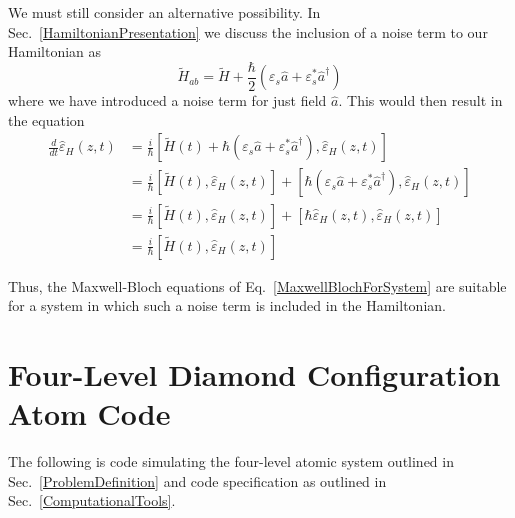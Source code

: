 \documentclass[aps,pra,showpacs,amsmath,amssymb,nofootinbib,longbibliography,superscriptaddress
]{revtex4-1}
\theoremstyle{definition}
\theoremstyle{remark}
\newcommand{\0}{\hat{0}}
\begin{document}
We must still consider an alternative possibility. In Sec.~\ref{HamiltonianPresentation} we discuss the inclusion of a noise term to our Hamiltonian as
\begin{equation}
    \tilde{H}_{ab} = \tilde{H} + 
    \frac{\hbar}{2} \left(\varepsilon_s \hat{a} + \varepsilon_s^* \hat{a}^{\dagger}\right)
\end{equation}
where we have introduced a noise term for just field $\hat{a}$. This would then result in the equation
\begin{align}
    \frac{d}{dt}\hat{\varepsilon}_H(z, t)
    &=
    \frac{i}{\hbar} \left[ \tilde{H}(t) + \hbar \left(\varepsilon_s \hat{a} + \varepsilon_s^* \hat{a}^{\dagger}\right), \hat{\varepsilon}_H(z, t) \right] \nonumber \\
    &=
    \frac{i}{\hbar} \left[ \tilde{H}(t), \hat{\varepsilon}_H(z, t)\right] + \left[\hbar \left(\varepsilon_s \hat{a} + \varepsilon_s^* \hat{a}^{\dagger}\right), \hat{\varepsilon}_H(z, t) \right] \nonumber \\
    &=
    \frac{i}{\hbar} \left[ \tilde{H}(t), \hat{\varepsilon}_H(z, t)\right] + \left[\hbar \hat{\varepsilon}_H(z, t), \hat{\varepsilon}_H(z, t) \right] \nonumber \\
    &=
    \frac{i}{\hbar} \left[ \tilde{H}(t), \hat{\varepsilon}_H(z, t)\right]
\end{align}

Thus, the Maxwell-Bloch equations of Eq.~\eqref{MaxwellBlochForSystem} are suitable for a system in which such a noise term is included in the Hamiltonian.

\pagebreak
\section{Four-Level Diamond Configuration Atom Code}\label{SimulatorCode}

The following is code simulating the four-level atomic system outlined in Sec.~\ref{ProblemDefinition} and code specification as outlined in Sec.~\ref{ComputationalTools}.

\label{FourLevelAtomCode}
\end{document}
